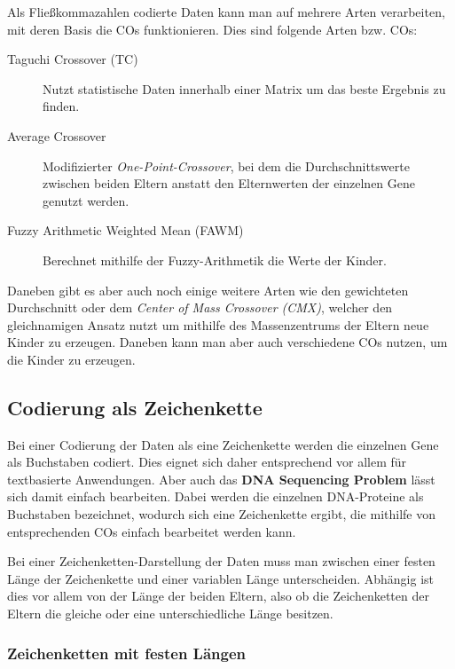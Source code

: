 	Als Fließkommazahlen codierte Daten kann man auf mehrere Arten verarbeiten, mit deren Basis die COs funktionieren. Dies sind \zB folgende Arten bzw. COs:
	
	\begin{description}
		\item[Taguchi Crossover (TC)] Nutzt statistische Daten innerhalb einer Matrix um das beste Ergebnis zu finden. \cite{TaguchiCrossover}
		\item[Average Crossover] Modifizierter \textit{One-Point-Crossover}, bei dem die Durchschnittswerte zwischen beiden Eltern anstatt den Elternwerten der einzelnen Gene genutzt werden. \cite{ConceptOfCOInRealCoded}
		\item[Fuzzy Arithmetic Weighted Mean (FAWM)] Berechnet mithilfe der Fuzzy-Arithmetik die Werte der Kinder. \cite{AirlineRevenueManagement}
	\end{description}
	
	Daneben gibt es aber auch noch einige weitere Arten wie \zB den gewichteten Durchschnitt oder dem \textit{Center of Mass Crossover (CMX)}, welcher den gleichnamigen Ansatz nutzt um mithilfe des Massenzentrums der Eltern neue Kinder zu erzeugen. \cite{MultiParentRecombination} Daneben kann man aber auch verschiedene COs nutzen, um die Kinder zu erzeugen.

\subsection{Codierung als Zeichenkette}
\label{sec:StrCod}
	
	Bei einer Codierung der Daten als eine Zeichenkette werden die einzelnen Gene als Buchstaben codiert. Dies eignet sich daher entsprechend vor allem für text\-ba\-sier\-te Anwendungen. Aber auch das \textbf{DNA Sequencing Problem} lässt sich damit einfach bearbeiten. Dabei werden die einzelnen DNA-Proteine als Buchstaben bezeichnet, wodurch sich eine Zeichenkette ergibt, die mithilfe von ent\-sprech\-end\-en COs einfach bearbeitet werden kann. \cite{Survey}
	
	Bei einer Zeichenketten-Darstellung der Daten muss man zwischen einer festen Länge der Zeichenkette und einer variablen Länge unterscheiden. Abhängig ist dies vor allem von der Länge der beiden Eltern, also ob die Zeichenketten der Eltern die gleiche oder eine unterschiedliche Länge besitzen.
	
	\subsubsection{Zeichenketten mit festen Längen}
	
